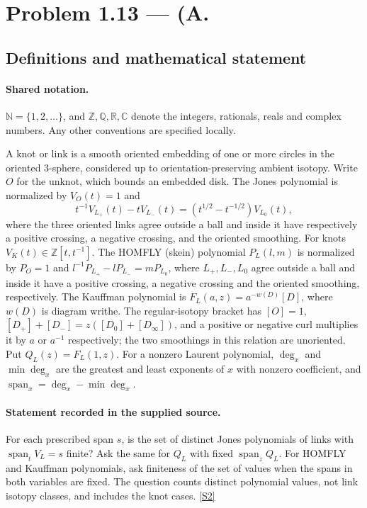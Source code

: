 \documentclass[11pt]{article}
\newcommand{\sref}[2]{\hyperlink{source:#1:#2}{[S#2]}}
\begin{document}
\section{Problem 1.13 — (A.}\label{statement}

\subsection{Definitions and mathematical statement}

\paragraph{Shared notation.}$\mathbb N=\{1,2,\ldots\}$, and $\mathbb Z,\mathbb Q,\mathbb R,\mathbb C$ denote the integers, rationals, reals and complex numbers. Any other conventions are specified locally.


A knot or link is a smooth oriented embedding of one or more circles in the oriented $3$-sphere, considered up to orientation-preserving ambient isotopy. Write $O$ for the unknot, which bounds an embedded disk. The Jones polynomial is normalized by $V_O(t)=1$ and
\[t^{-1}V_{L_+}(t)-tV_{L_-}(t)=(t^{1/2}-t^{-1/2})V_{L_0}(t),\]
where the three oriented links agree outside a ball and inside it have respectively a positive crossing, a negative crossing, and the oriented smoothing. For knots $V_K(t)\in\mathbb Z[t,t^{-1}]$. The HOMFLY (skein) polynomial $P_L(l,m)$ is normalized by $P_O=1$ and $l^{-1}P_{L_+}-lP_{L_-}=mP_{L_0}$, where $L_+,L_-,L_0$ agree outside a ball and inside it have a positive crossing, a negative crossing and the oriented smoothing, respectively. The Kauffman polynomial is $F_L(a,z)=a^{-w(D)}[D]$, where $w(D)$ is diagram writhe. The regular-isotopy bracket has $[O]=1$, $[D_+]+[D_-]=z([D_0]+[D_\infty])$, and a positive or negative curl multiplies it by $a$ or $a^{-1}$ respectively; the two smoothings in this relation are unoriented. Put $Q_L(z)=F_L(1,z)$. For a nonzero Laurent polynomial, $\deg_x$ and $\min\deg_x$ are the greatest and least exponents of $x$ with nonzero coefficient, and $\operatorname{span}_x=\deg_x-\min\deg_x$.
\paragraph{Statement recorded in the supplied source.}
For each prescribed span $s$, is the set of distinct Jones polynomials of links with $\operatorname{span}_tV_L=s$ finite? Ask the same for $Q_L$ with fixed $\operatorname{span}_zQ_L$. For HOMFLY and Kauffman polynomials, ask finiteness of the set of values when the spans in both variables are fixed. The question counts distinct polynomial values, not link isotopy classes, and includes the knot cases. \sref{statement}{2}
\end{document}
